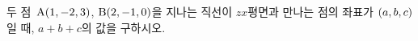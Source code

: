 두 점~$\mathrm{A}(1{,}\mkern3mu\mathopen{}-2{,}\mkern3mu\mathopen{}3)$, $\mathrm{B}(2{,}\mkern3mu\mathopen{}-1{,}\mkern3mu\mathopen{}0)$을 지나는 직선이 $zx$평면과 만나는 점의 좌표가 $(a{,}\mkern3mu\mathopen{}b{,}\mkern3mu\mathopen{}c)$일 때, $a+b+c$의 값을 구하시오.
